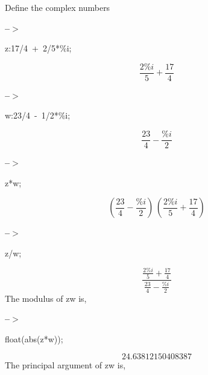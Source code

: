 \documentclass[fleqn]{article}
\begin{document}
Define the complex numbers


\noindent
\begin{minipage}[t]{4.000000em}\color{red}\bfseries
 --\ensuremath{\ensuremath{>}}	
\end{minipage}
\begin{minipage}[t]{\textwidth}\color{blue}
z:17/4\ +\ 2/5*\%i;
\end{minipage}
\[\displaystyle \tag{z} 
\frac{2 \% i}{5}\mathop{+}\frac{17}{4}\mbox{}
\]


\noindent
\begin{minipage}[t]{4.000000em}\color{red}\bfseries
 --\ensuremath{\ensuremath{>}}	
\end{minipage}
\begin{minipage}[t]{\textwidth}\color{blue}
w:23/4\ -\ 1/2*\%i;
\end{minipage}
\[\displaystyle \tag{w} 
\frac{23}{4}\mathop{-}\frac{\% i}{2}\mbox{}
\]


\noindent
\begin{minipage}[t]{4.000000em}\color{red}\bfseries
 --\ensuremath{\ensuremath{>}}	
\end{minipage}
\begin{minipage}[t]{\textwidth}\color{blue}
z*w;
\end{minipage}
\[\displaystyle \tag{\% o5} 
\left( \frac{23}{4}\mathop{-}\frac{\% i}{2}\right) \, \left( \frac{2 \% i}{5}\mathop{+}\frac{17}{4}\right) \mbox{}
\]


\noindent
\begin{minipage}[t]{4.000000em}\color{red}\bfseries
 --\ensuremath{\ensuremath{>}}	
\end{minipage}
\begin{minipage}[t]{\textwidth}\color{blue}
z/w;
\end{minipage}
\[\displaystyle \tag{\% o14} 
\frac{\frac{2 \% i}{5}\mathop{+}\frac{17}{4}}{\frac{23}{4}\mathop{-}\frac{\% i}{2}}\mbox{}
\]
The  modulus of zw is,


\noindent
\begin{minipage}[t]{4.000000em}\color{red}\bfseries
 --\ensuremath{\ensuremath{>}}	
\end{minipage}
\begin{minipage}[t]{\textwidth}\color{blue}
float(abs(z*w));
\end{minipage}
\[\displaystyle \tag{\% o13} 
24.63812150408387\mbox{}
\]
The principal argument of zw is,
\end{document}
